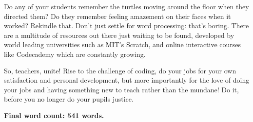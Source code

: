 \documentclass[11pt,a4paper]{article}
\begin{document}
Do any of your students remember the turtles moving around the floor when they directed them? Do they remember feeling amazement on their faces when it worked? Rekindle that. Don't just settle for word processing: that's boring. There are a multitude of resources out there just waiting to be found, developed by world leading universities such as MIT's Scratch, and online interactive courses like Codecademy which are constantly growing.

So, teachers, unite! Rise to the challenge of coding, do your jobs for your own satisfaction and personal development, but more importantly for the love of doing your jobs and having something new to teach rather than the mundane! Do it, before you no longer do your pupils justice.

\begin{center}
	\textbf{Final word count: 541 words.}
\end{center}
\end{document}
